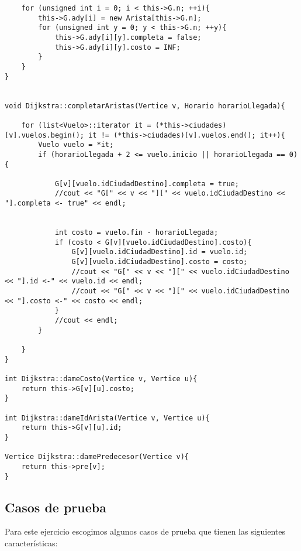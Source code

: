 \begin{lstlisting}
	for (unsigned int i = 0; i < this->G.n; ++i){
		this->G.ady[i] = new Arista[this->G.n];
		for (unsigned int y = 0; y < this->G.n; ++y){
			this->G.ady[i][y].completa = false;
			this->G.ady[i][y].costo = INF;
		}
	}
}


void Dijkstra::completarAristas(Vertice v, Horario horarioLlegada){

	for (list<Vuelo>::iterator it = (*this->ciudades)[v].vuelos.begin(); it != (*this->ciudades)[v].vuelos.end(); it++){
		Vuelo vuelo = *it;
		if (horarioLlegada + 2 <= vuelo.inicio || horarioLlegada == 0){

			G[v][vuelo.idCiudadDestino].completa = true;
			//cout << "G[" << v << "][" << vuelo.idCiudadDestino << "].completa <- true" << endl;


			int costo = vuelo.fin - horarioLlegada;
			if (costo < G[v][vuelo.idCiudadDestino].costo){
				G[v][vuelo.idCiudadDestino].id = vuelo.id;
				G[v][vuelo.idCiudadDestino].costo = costo;
				//cout << "G[" << v << "][" << vuelo.idCiudadDestino << "].id <-" << vuelo.id << endl;
				//cout << "G[" << v << "][" << vuelo.idCiudadDestino << "].costo <-" << costo << endl;
			}
			//cout << endl;
		}

	}
}

int Dijkstra::dameCosto(Vertice v, Vertice u){
	return this->G[v][u].costo;
}

int Dijkstra::dameIdArista(Vertice v, Vertice u){
	return this->G[v][u].id;
}

Vertice Dijkstra::damePredecesor(Vertice v){
	return this->pre[v];
}

\end{lstlisting}
\bigskip


\subsection{Casos de prueba}

Para este ejercicio escogimos algunos casos de prueba que tienen las siguientes características:

